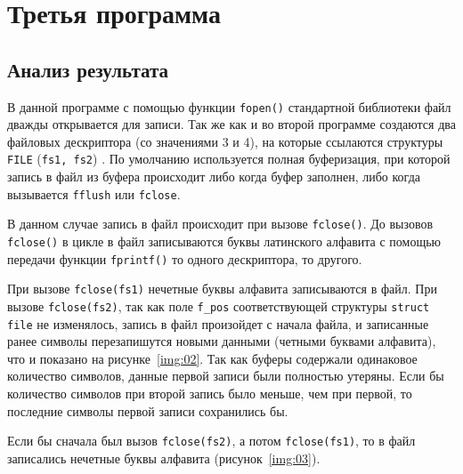 \chapter{Третья программа}

\vspace{-0.5cm}




\vspace{-0.7cm}
\section*{Анализ результата}
\vspace{-0.2cm}

В данной программе с помощью функции \texttt{fopen()} стандартной
библиотеки файл дважды открывается для записи. Так же как и во второй программе
создаются два файловых дескриптора (со значениями 3 и 4), на которые
ссылаются структуры \texttt{FILE} (\texttt{fs1, fs2}) . По умолчанию используется полная
буферизация, при которой запись в файл из буфера происходит либо когда буфер
заполнен, либо когда вызывается \texttt{fflush} или
\texttt{fclose}.

В данном случае запись в файл происходит при вызове \texttt{fclose()}. До
вызовов \texttt{fclose()} в цикле в файл записываются буквы латинского
алфавита с помощью передачи функции \texttt{fprintf()} то одного
дескриптора, то другого.

При вызове \texttt{fclose(fs1)} нечетные буквы алфавита записываются в файл.
При вызове \texttt{fclose(fs2)}, так как поле \texttt{f\_pos}
соответствующей структуры \texttt{struct file} не изменялось, запись в файл
произойдет с начала файла, и записанные ранее символы перезапишутся новыми
данными (четными буквами алфавита), что и показано на рисунке~\ref{img:02}.
Так как буферы содержали одинаковое количество символов, данные первой
записи были полностью утеряны. Если бы количество символов при второй
запись было меньше, чем при первой, то последние символы первой записи
сохранились бы.

Если бы сначала был вызов \texttt{fclose(fs2)}, а потом \texttt{fclose(fs1)},
то в файл записались нечетные буквы алфавита (рисунок~\ref{img:03}).

